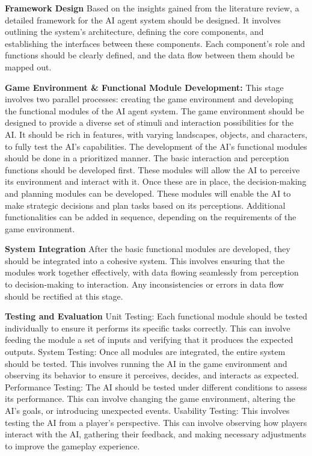 \textbf{Framework Design}\quad
Based on the insights gained from the literature review, a detailed framework for the AI agent system should be designed. It involves outlining the system's architecture, defining the core components, and establishing the interfaces between these components. Each component's role and functions should be clearly defined, and the data flow between them should be mapped out.

\textbf{Game Environment \& Functional Module Development:}\quad
This stage involves two parallel processes: creating the game environment and developing the functional modules of the AI agent system. 
The game environment should be designed to provide a diverse set of stimuli and interaction possibilities for the AI. It should be rich in features, with varying landscapes, objects, and characters, to fully test the AI's capabilities. 
The development of the AI's functional modules should be done in a prioritized manner. 
The basic interaction and perception functions should be developed first. 
These modules will allow the AI to perceive its environment and interact with it. 
Once these are in place, the decision-making and planning modules can be developed. 
These modules will enable the AI to make strategic decisions and plan tasks based on its perceptions. 
Additional functionalities can be added in sequence, depending on the requirements of the game environment.

\textbf{System Integration}\quad
After the basic functional modules are developed, they should be integrated into a cohesive system. 
This involves ensuring that the modules work together effectively, with data flowing seamlessly from perception to decision-making to interaction. 
Any inconsistencies or errors in data flow should be rectified at this stage.

\textbf{Testing and Evaluation}\quad
Unit Testing: Each functional module should be tested individually to ensure it performs its specific tasks correctly. This can involve feeding the module a set of inputs and verifying that it produces the expected outputs. 
System Testing: Once all modules are integrated, the entire system should be tested. This involves running the AI in the game environment and observing its behavior to ensure it perceives, decides, and interacts as expected. 
Performance Testing: The AI should be tested under different conditions to assess its performance. This can involve changing the game environment, altering the AI's goals, or introducing unexpected events. 
Usability Testing: This involves testing the AI from a player's perspective. This can involve observing how players interact with the AI, gathering their feedback, and making necessary adjustments to improve the gameplay experience.

